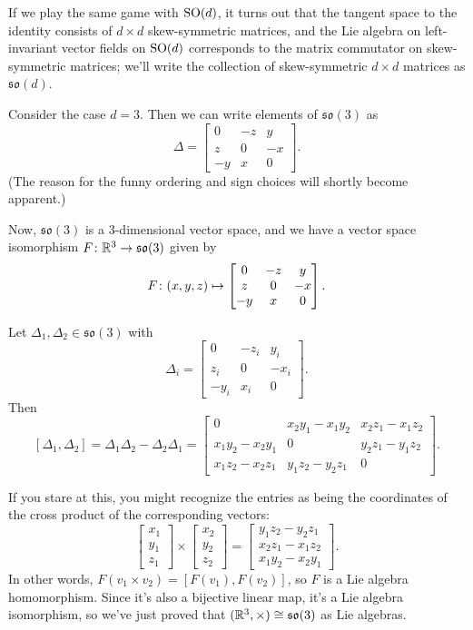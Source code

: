 \begin{example}\label{ex:so3 Lie algebra}
	If we play the same game with $\operatorname{SO}(d)$, it turns out that the tangent space to the identity consists of $d \times d$ skew-symmetric matrices, and the Lie algebra on left-invariant vector fields on $\operatorname{SO}(d)$ corresponds to the matrix commutator on skew-symmetric matrices; we'll write the collection of skew-symmetric $d \times d$ matrices as $\mathfrak{so}(d)$.
	
	Consider the case $d = 3$. Then we can write elements of $\mathfrak{so}(3)$ as 
	\[
		\Delta = \begin{bmatrix} 0 & -z & y \\ z & 0 & -x \\ -y & x & 0 \end{bmatrix}.
	\]
	(The reason for the funny ordering and sign choices will shortly become apparent.)
	
	Now, $\mathfrak{so}(3)$ is a 3-dimensional vector space, and we have a vector space isomorphism $F\colon\thinspace\! \mathbb{R}^3 \to \mathfrak{so}(3)$ given by
	\begin{equation}\label{eq:r3 so3 isomorphism}
		F \colon\thinspace\! (x,y,z) \mapsto \begin{bmatrix} 0 & -z & y \\ z & 0 & -x \\ -y & x & 0 \end{bmatrix}.
	\end{equation}
	
	Let $\Delta_1,\Delta_2 \in \mathfrak{so}(3)$ with 
	\[
		\Delta_i = \begin{bmatrix} 0 & -z_i & y_i \\ z_i & 0 & -x_i \\ -y_i & x_i & 0 \end{bmatrix}.
	\]
	Then
	\[
		[\Delta_1, \Delta_2] = \Delta_1 \Delta_2 - \Delta_2 \Delta_1 = \begin{bmatrix} 0 & x_2 y_1-x_1 y_2 & x_2 z_1-x_1 z_2 \\
 x_1 y_2-x_2 y_1 & 0 & y_2 z_1-y_1 z_2 \\
 x_1 z_2-x_2 z_1 & y_1 z_2-y_2 z_1 & 0 \end{bmatrix}.
	\]
	
	If you stare at this, you might recognize the entries as being the coordinates of the cross product of the corresponding vectors:
	\[
		\begin{bmatrix} x_1 \\ y_1 \\ z_1 \end{bmatrix} \times \begin{bmatrix} x_2 \\ y_2 \\ z_2 \end{bmatrix} = \begin{bmatrix} y_1 z_2-y_2 z_1 \\ x_2 z_1-x_1 z_2 \\ x_1 y_2-x_2 y_1 \end{bmatrix}.
	\]
	In other words, $F(v_1 \times v_2) = [F(v_1), F(v_2)]$, so $F$ is a Lie algebra homomorphism. Since it's also a bijective linear map, it's a Lie algebra isomorphism, so we've just proved that $(\mathbb{R}^3, \times) \cong \mathfrak{so}(3)$ as Lie algebras.
	

\end{example}
